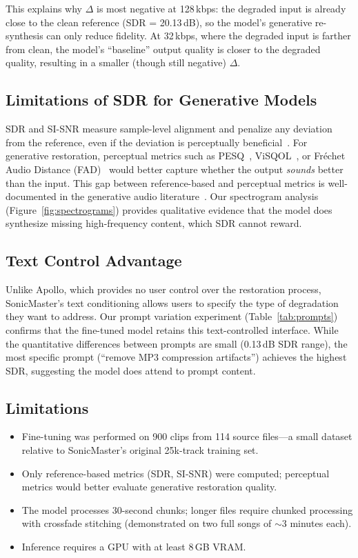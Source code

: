 \documentclass[conference]{IEEEtran}
\begin{document}
This explains why $\Delta$ is most negative at 128\,kbps: the degraded input
is already close to the clean reference (SDR = 20.13\,dB), so the model's
generative re-synthesis can only reduce fidelity. At 32\,kbps, where the
degraded input is farther from clean, the model's ``baseline'' output quality
is closer to the degraded quality, resulting in a smaller (though still
negative) $\Delta$.

\subsection{Limitations of SDR for Generative Models}

SDR and SI-SNR measure sample-level alignment and penalize any deviation from
the reference, even if the deviation is perceptually beneficial~\cite{le2019sdr}.
For generative restoration, perceptual metrics such as
PESQ~\cite{rix2001pesq}, ViSQOL~\cite{hershey2007visqol}, or Fr\'{e}chet
Audio Distance (FAD)~\cite{kilgour2019fad} would better capture whether the
output \emph{sounds} better than the input. This gap between reference-based
and perceptual metrics is well-documented in the generative audio
literature~\cite{liu2023audioldm, kong2020hifigan}. Our spectrogram analysis
(Figure~\ref{fig:spectrograms}) provides qualitative evidence that the model
does synthesize missing high-frequency content, which SDR cannot reward.

\subsection{Text Control Advantage}
Unlike Apollo, which provides no user control over the restoration process,
SonicMaster's text conditioning allows users to specify the type of
degradation they want to address. Our prompt variation experiment
(Table~\ref{tab:prompts}) confirms that the fine-tuned model retains this
text-controlled interface. While the quantitative differences between prompts
are small (0.13\,dB SDR range), the most specific prompt (``remove MP3
compression artifacts'') achieves the highest SDR, suggesting the model does
attend to prompt content.

\subsection{Limitations}
\begin{itemize}
    \item Fine-tuning was performed on 900 clips from 114 source files---a
    small dataset relative to SonicMaster's original 25k-track training set.
    \item Only reference-based metrics (SDR, SI-SNR) were computed; perceptual
    metrics would better evaluate generative restoration quality.
    \item The model processes 30-second chunks; longer files require chunked
    processing with crossfade stitching (demonstrated on two full songs of
    $\sim$3 minutes each).
    \item Inference requires a GPU with at least 8\,GB VRAM.
\end{itemize}
\end{document}

